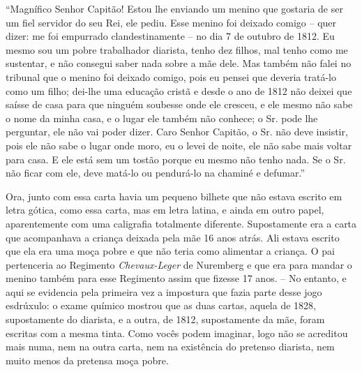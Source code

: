 ``Magnífico Senhor Capitão! Estou lhe enviando um menino que gostaria de
ser um fiel servidor do seu Rei, ele pediu. Esse menino foi deixado
comigo -- quer dizer: me foi empurrado clandestinamente -- no dia 7 de
outubro de 1812. Eu mesmo sou um pobre trabalhador diarista, tenho dez
filhos, mal tenho como me sustentar, e não consegui saber nada sobre a
mãe dele. Mas também não falei no tribunal que o menino foi deixado
comigo, pois eu pensei que deveria tratá-lo como um filho; dei-lhe uma
educação cristã e desde o ano de 1812 não deixei que saísse de casa para
que ninguém soubesse onde ele cresceu, e ele mesmo não sabe o nome da
minha casa, e o lugar ele também não conhece; o Sr. pode lhe perguntar,
ele não vai poder dizer. Caro Senhor Capitão, o Sr. não deve insistir,
pois ele não sabe o lugar onde moro, eu o levei de noite, ele não sabe
mais voltar para casa. E ele está sem um tostão porque eu mesmo não
tenho nada. Se o Sr. não ficar com ele, deve matá-lo ou pendurá-lo na
chaminé e defumar.''

Ora, junto com essa carta havia um pequeno bilhete que não estava
escrito em letra gótica, como essa carta, mas em letra latina, e ainda
em outro papel, aparentemente com uma caligrafia totalmente diferente.
Supostamente era a carta que acompanhava a criança deixada pela mãe 16
anos atrás. Ali estava escrito que ela era uma moça pobre e que não
teria como alimentar a criança. O pai pertenceria ao Regimento
\emph{Chevaux-Leger} de Nuremberg e que era para mandar o menino também
para esse Regimento assim que fizesse 17 anos. -- No entanto, e aqui se
evidencia pela primeira vez a impostura que fazia parte desse jogo
esdrúxulo: o exame químico mostrou que as duas cartas, aquela de 1828,
supostamente do diarista, e a outra, de 1812, supostamente da mãe, foram
escritas com a mesma tinta. Como vocês podem imaginar, logo não se
acreditou mais numa, nem na outra carta, nem na existência do pretenso
diarista, nem muito menos da pretensa moça pobre.

